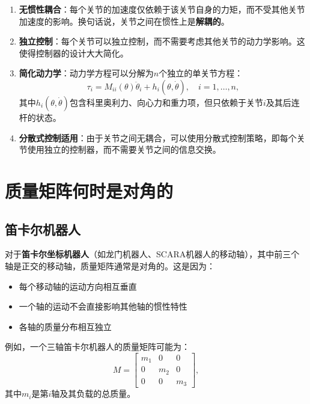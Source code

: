 \documentclass{article}
\begin{document}
\begin{enumerate}
\item \textbf{无惯性耦合}：每个关节的加速度仅依赖于该关节自身的力矩，而不受其他关节加速度的影响。换句话说，关节之间在惯性上是\textbf{解耦的}。

\item \textbf{独立控制}：每个关节可以独立控制，而不需要考虑其他关节的动力学影响。这使得控制器的设计大大简化。

\item \textbf{简化动力学}：动力学方程可以分解为$n$个独立的单关节方程：
\begin{equation}
\tau_i = M_{ii}(\theta)\ddot{\theta}_i + h_i(\theta, \dot{\theta}), \quad i = 1, \ldots, n,
\end{equation}
其中$h_i(\theta, \dot{\theta})$包含科里奥利力、向心力和重力项，但只依赖于关节$i$及其后连杆的状态。

\item \textbf{分散式控制适用}：由于关节之间无耦合，可以使用分散式控制策略，即每个关节使用独立的控制器，而不需要关节之间的信息交换。
\end{enumerate}

\section{质量矩阵何时是对角的}

\subsection{笛卡尔机器人}

对于\textbf{笛卡尔坐标机器人}（如龙门机器人、SCARA机器人的移动轴），其中前三个轴是正交的移动轴，质量矩阵通常是对角的。这是因为：

\begin{itemize}
\item 每个移动轴的运动方向相互垂直
\item 一个轴的运动不会直接影响其他轴的惯性特性
\item 各轴的质量分布相互独立
\end{itemize}

例如，一个三轴笛卡尔机器人的质量矩阵可能为：
\begin{equation}
M = \begin{bmatrix}
m_1 & 0 & 0 \\
0 & m_2 & 0 \\
0 & 0 & m_3
\end{bmatrix},
\end{equation}
其中$m_i$是第$i$轴及其负载的总质量。
\end{document}
